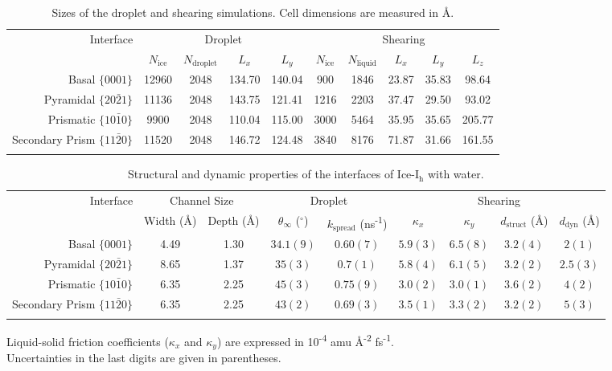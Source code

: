 \documentclass[aps,jcp,preprint,showpacs,superscriptaddress,groupedaddress]{revtex4}  %
\begin{document}
\newpage
\begin{table}[h]
\centering
\caption{Sizes of the droplet and shearing simulations.  Cell
  dimensions are measured in \AA. \label{tab:method}}
\begin{tabular}{r|cccc|ccccc} 
\toprule
 \multirow{2}{*}{Interface} & \multicolumn{4}{c|}{Droplet} & \multicolumn{5}{c}{
Shearing} \\
  & $N_\mathrm{ice}$ & $N_\mathrm{droplet}$ & $L_x$ & $L_y$ & $N_\mathrm{ice}$ &
 $N_\mathrm{liquid}$ & $L_x$ & $L_y$ & $L_z$  \\ 
\colrule
Basal  $\{0001\}$                    & 12960 & 2048 & 134.70 & 140.04 & 900 & 1846  & 23.87 & 35.83 & 98.64  \\
Pyramidal  $\{20\bar{2}1\}$       & 11136 & 2048 & 143.75 & 121.41 & 1216 & 2203 & 37.47 & 29.50 & 93.02  \\
Prismatic  $\{10\bar{1}0\}$       &  9900 & 2048 & 110.04 & 115.00 & 3000 & 5464 & 35.95 & 35.65 & 205.77 \\
Secondary Prism  $\{11\bar{2}0\}$ & 11520 & 2048 & 146.72 & 124.48 & 3840 & 8176 & 71.87 & 31.66 & 161.55 \\
\botrule
\end{tabular}
\end{table}

\newpage
\begin{table}[h]
\centering
\caption{Structural and dynamic properties of the interfaces of
  Ice-I$_\mathrm{h}$ with water.\label{tab:kappa}}
\begin{tabular}{r|cc|cc|cccc}  
\toprule
\multirow{2}{*}{Interface} & \multicolumn{2}{c|}{Channel Size} &\multicolumn{2}{c|}{Droplet} & \multicolumn{4}{c}{Shearing\footnotemark[1]}\\
  & Width (\AA) & Depth (\AA) & $\theta_{\infty}$ ($^\circ$)  & $k_\mathrm{spread}$  (ns\textsuperscript{-1}) &
$\kappa_{x}$  & $\kappa_{y}$ & $d_\mathrm{struct}$ (\AA) &  $d_\mathrm{dyn}$ (\AA) \\ 
\colrule
Basal  $\{0001\}$                    & 4.49 & 1.30 & $34.1(9)$ &$0.60(7)$
& $5.9(3)$ & $6.5(8)$ & $3.2(4)$ & $2(1)$  \\
Pyramidal  $\{20\bar{2}1\}$       & 8.65 & 1.37 & $35(3)$ &  $0.7(1)$ &
$5.8(4)$ & $6.1(5)$ & $3.2(2)$ & $2.5(3)$\\
Prismatic  $\{10\bar{1}0\}$       & 6.35 & 2.25 & $45(3)$ & $0.75(9)$ &
$3.0(2)$ & $3.0(1)$ & $3.6(2)$ & $4(2)$ \\
Secondary Prism  $\{11\bar{2}0\}$ & 6.35 & 2.25 & $43(2)$ & $0.69(3)$ &
$3.5(1)$ & $3.3(2)$ & $3.2(2)$ & $5(3)$ \\ 
\botrule
\end{tabular}
\begin{flushleft}
\footnotemark[1]\footnotesize{Liquid-solid friction coefficients ($\kappa_x$ and
  $\kappa_y$) are expressed in 10\textsuperscript{-4} amu
  \AA\textsuperscript{-2} fs\textsuperscript{-1}.} \\
\footnotemark[2]\footnotesize{Uncertainties in
  the last digits are given in parentheses.} 
\end{flushleft}
\end{table}
\end{document}
